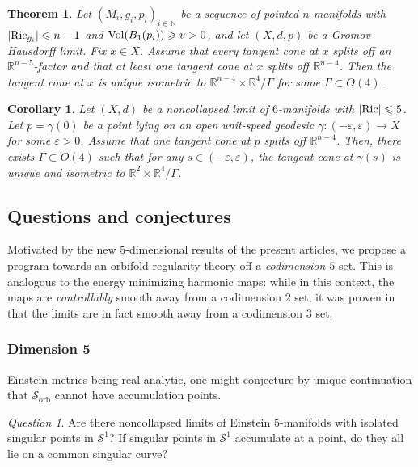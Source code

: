 \documentclass[11pt,reqno]{amsart}
\numberwithin{equation}{section}
\newcommand{\Ric}{{\rm Ric}}
\newcommand{\Vol}{{\rm Vol}}
\newtheorem{cor}[thm]{Corollary}
\newtheorem{theorem}[thm]{Theorem}
\theoremstyle{definition}
\theoremstyle{remark}
\newtheorem{question}[thm]{Question}
\begin{document}
\begin{theorem}\label{thm:higher dimension unique}
Let $(M_i,g_i,p_i)_{i\in\mathbb{N}}$ be a sequence of pointed $n$-manifolds with
$| \Ric_{g_i}| \leqslant n-1$ and $\Vol(B_1(p_i))\geqslant v>0$, and let $(X,d,p)$ be a
Gromov-Hausdorff limit. Fix $x\in X$. Assume that every tangent cone at $x$ splits off an $\mathbb{R}^{n-5}$-factor and that at least one
tangent cone at $x$ splits off $\mathbb{R}^{n-4}$. Then the tangent cone at $x$ is unique isometric to $\mathbb{R}^{n-4}\times \mathbb{R}^4/\Gamma$ for some $\Gamma\subset O(4)$.
\end{theorem}

\begin{cor}

    Let $(X,d)$ be a noncollapsed limit of  $6$-manifolds with $|\Ric|\leqslant 5$. Let $p = \gamma(0)$ be a point lying on an open unit-speed geodesic $\gamma: (-\varepsilon,\varepsilon)\to X$ for some $\varepsilon>0$. Assume that \emph{one} tangent cone at $p$ splits off $\mathbb{R}^{n-4}$. Then, there exists $\Gamma\subset O(4)$ such that for any $s\in(-\varepsilon,\varepsilon)$, the tangent cone at $\gamma(s)$ is unique and isometric to $\mathbb{R}^2\times\mathbb{R}^4/\Gamma$. 
\end{cor}



\subsection{Questions and conjectures}\label{subs:conjectures}

Motivated by the new $5$-dimensional results of the present articles, we propose a program towards an orbifold regularity theory off a \textit{codimension $5$} set. This is analogous to the energy minimizing  harmonic maps: while in this context, the maps are \textit{controllably} smooth away from a codimension $2$ set, it was proven in \cite{su82} that the limits are in fact smooth away from a codimension $3$ set. 


\subsubsection{Dimension 5}

 Einstein metrics being real-analytic, one might conjecture by unique continuation that $\mathcal{S}_{\mathrm{orb}}$ cannot have accumulation points. 

\begin{question}
    Are there noncollapsed limits of Einstein $5$-manifolds with isolated singular points in $\mathcal{S}^1$? If singular points in $\mathcal{S}^1$ accumulate at a point, do they all lie on a common singular curve?
\end{question}
\end{document}
